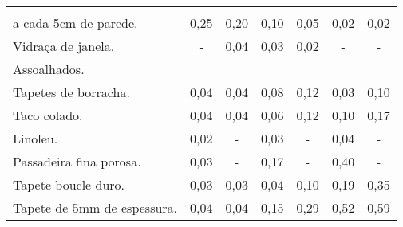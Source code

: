 \begin{anexosenv}
\begin{center}
\begin{longtable}{l|c|c|c|c|c|c}
\begin{tabular}[c]{@{}l@{}}Revestimento de vidro espaçado \\ a cada 5cm de parede.\end{tabular}                                                                                                                   & 0,25 & 0,20 & 0,10 & 0,05  & 0,02 & 0,02 \\
Vidraça de janela.                                                                                                                                                                                                & -    & 0,04 & 0,03 & 0,02  & -    & -    \\
Assoalhados.                                                                                                                                                                                                      &      &      &      &       &      &      \\
Tapetes de borracha.                                                                                                                                                                                              & 0,04 & 0,04 & 0,08 & 0,12  & 0,03 & 0,10 \\
Taco colado.                                                                                                                                                                                                      & 0,04 & 0,04 & 0,06 & 0,12  & 0,10 & 0,17 \\
Linoleu.                                                                                                                                                                                                          & 0,02 & -    & 0,03 & -     & 0,04 & -    \\
Passadeira fina porosa.                                                                                                                                                                                           & 0,03 & -    & 0,17 & -     & 0,40 & -    \\
Tapete boucle duro.                                                                                                                                                                                               & 0,03 & 0,03 & 0,04 & 0,10  & 0,19 & 0,35 \\
Tapete de 5mm de espessura.                                                                                                                                                                                       & 0,04 & 0,04 & 0,15 & 0,29  & 0,52 & 0,59 \\

\end{longtable}
\end{center}
\end{anexosenv}
